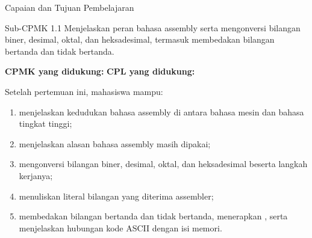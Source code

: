 \documentclass[aspectratio=169,11pt]{beamer}
\begin{document}

\begin{frame}{Capaian dan Tujuan Pembelajaran}
\begin{block}{Sub-CPMK 1.1}
\small Menjelaskan peran bahasa assembly serta mengonversi bilangan
biner, desimal, oktal, dan heksadesimal, termasuk membedakan bilangan
bertanda dan tidak bertanda.
\end{block}

\vspace{0.1em}
{\small\textbf{CPMK yang didukung:} \quad\textbullet\quad
\textbf{CPL yang didukung:} \par}

\vspace{0.15em}
\begin{exampleblock}{Setelah pertemuan ini, mahasiswa mampu:}
\footnotesize
\begin{enumerate}
    \item menjelaskan kedudukan bahasa assembly di antara bahasa mesin
          dan bahasa tingkat tinggi;
    \item menjelaskan alasan bahasa assembly masih dipakai;
    \item mengonversi bilangan biner, desimal, oktal, dan heksadesimal
          beserta langkah kerjanya;
    \item menuliskan literal bilangan yang diterima assembler;
    \item membedakan bilangan bertanda dan tidak bertanda,
          menerapkan , serta menjelaskan
          hubungan kode ASCII dengan isi memori.
\end{enumerate}
\end{exampleblock}
\end{frame}
\end{document}
